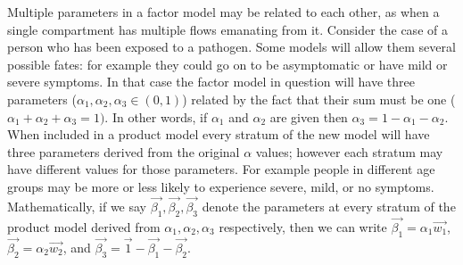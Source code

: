 \documentclass{article}
\theoremstyle{definition}
\begin{document}
Multiple parameters in a factor model may be related to each other, as when a single compartment has multiple flows emanating from it. Consider the case of a person who has been exposed to a pathogen. Some models will allow them several possible fates: for example they could go on to be asymptomatic or have mild or severe symptoms. In that case the factor model in question will have three parameters ($\alpha_1, \alpha_2, \alpha_3\in (0,1)$) related by the fact that their sum must be one ($\alpha_1+\alpha_2+\alpha_3 = 1)$. In other words, if $\alpha_1$ and $\alpha_2$ are given then $\alpha_3 = 1-\alpha_1 - \alpha_2$. When included in a product model every stratum of the new model will have three parameters derived from the original $\alpha$ values; however each stratum may have different values for those parameters. For example people in different age groups may be more or less likely to experience severe, mild, or no symptoms. Mathematically, if we say $\vec{\beta_1}, \vec{\beta_2}, \vec{\beta_3}$ denote the parameters at every stratum of the product model derived from $\alpha_1, \alpha_2, \alpha_3$ respectively, then we can write $\vec{\beta_1} = \alpha_1\vec{w_1}$, $\vec{\beta_2} = \alpha_2\vec{w_2}$, and $\vec{\beta_3} = \vec{1} - \vec{\beta_1} - \vec{\beta_2}$.
\end{document}
